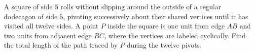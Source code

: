 A square of side $5$ rolls without slipping around the outside of a regular dodecagon of side $5$, pivoting successively about their shared vertices until it has visited all twelve sides. A point $P$ inside the square is one unit from edge $AB$ and two units from adjacent edge $BC$, where the vertices are labeled cyclically. Find the total length of the path traced by $P$ during the twelve pivots.
